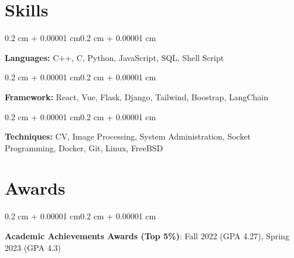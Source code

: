 \documentclass[10pt, letterpaper]{article}
\newenvironment{highlights}{
    \begin{itemize}[
        topsep=0.10 cm,
        parsep=0.10 cm,
        partopsep=0pt,
        itemsep=0pt,
        leftmargin=0.4 cm + 10pt
    ]
}{
    \end{itemize}
}
\newenvironment{onecolentry}{
    \begin{adjustwidth}{0.2 cm + 0.00001 cm}{0.2 cm + 0.00001 cm}
}{
    \end{adjustwidth}
}
\newenvironment{twocolentry}[2][]{
    \onecolentry
    \def\secondColumn{#2}
    \setcolumnwidth{\fill, 4.5 cm}
    \begin{paracol}{2}
}{
    \switchcolumn \raggedleft \secondColumn
    \end{paracol}
    \endonecolentry
}
\let\hrefWithoutArrow\href
\renewcommand{\href}[2]{\hrefWithoutArrow{#1}{\ifthenelse{\equal{#2}{}}{ }{#2 }\raisebox{.15ex}{\footnotesize \faExternalLink*}}}
\begin{document}



    \section{Skills}
        \begin{onecolentry}
            \textbf{Languages:} C++, C, Python, JavaScript, SQL, Shell Script
        \end{onecolentry}
        
        \vspace{0.15 cm}
        \begin{onecolentry}
            \textbf{Framework:} React, Vue, Flask, Django, Tailwind, Boostrap, LangChain
        \end{onecolentry}
        
        \vspace{0.15 cm}
        \begin{onecolentry}
            \textbf{Techniques:} CV, Image Processing, System Administration, Socket Programming, Docker, Git, Linux, FreeBSD
        \end{onecolentry}

    \section{Awards}
        \begin{onecolentry}
            \textbf{Academic Achievements Awards (Top 5\%)}: Fall 2022 (GPA 4.27), Spring 2023 (GPA 4.3)
        \end{onecolentry}
        
\end{document}
